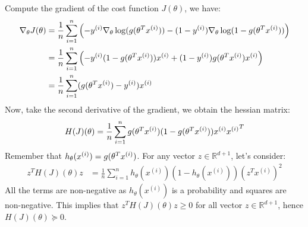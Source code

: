 \begin{answer}
Compute the gradient of the cost function $J(\theta)$, we have:
%
\begin{align}
	\nabla_{\theta}J(\theta) 
	&= \frac{1}{n} \sum \limits_{i = 1}^{n} \left(-y^{(i)} \nabla_{\theta}\log(g(\theta^{T}x^{(i)})) - (1 - y^{(i)}) \nabla_{\theta}\log(1 - g(\theta^{T}x^{(i)}))\right) \\
	&= \frac{1}{n} \sum_{i = 1}^{n} \left(-y^{(i)}(1 - g(\theta^{T}x^{(i)}))x^{(i)} + (1 - y^{(i)}) g(\theta^{T}x^{(i)}) x^{(i)}\right) \\
	&= \frac{1}{n} \sum \limits_{i = 1}^{n} (g(\theta^{T}x^{(i)}) - y^{(i)}) x^{(i)}
\end{align}
%
Now, take the second derivative of the gradient, we obtain the hessian matrix:
%
\begin{align}
	H(J)(\theta) 
	= \frac{1}{n} \sum \limits_{i = 1}^{n} g(\theta^{T}x^{(i)})(1 - g(\theta^{T}x^{(i)})) x^{(i)} {x^{(i)}}^T
\end{align}
%
Remember that $h_{\theta}(x^{(i)}) = g(\theta^{T}x^{(i)})$.
For any vector $z \in \mathbb{R}^{d + 1}$, let's consider:
%
\begin{align}
	z^{T} H(J)(\theta) z
	&= \frac{1}{n} \sum \limits_{i = 1}^{n} h_{\theta}(x^{(i)})(1 - h_{\theta}(x^{(i)})) (z^{T} x^{(i)})^2
\end{align}
%
All the terms are non-negative as $h_{\theta}(x^{(i)})$ is a probability and squares are non-negative. This implies that $z^{T} H(J)(\theta) z \ge 0$ for all vector $z \in \mathbb{R}^{d + 1}$, hence $H(J)(\theta) \succeq 0$. \\
\end{answer}




















